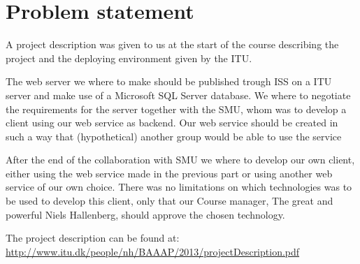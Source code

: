 \section{Problem statement}
A project description was given to us at the start of the course describing the project and the deploying environment given by the ITU.

The web server we where to make should be published trough ISS on a ITU server and make use of a Microsoft SQL Server database.
We where to negotiate the requirements for the server together with the SMU, whom was to develop a client using our web service as backend.
Our web service should be created in such a way that (hypothetical) another group would be able to use the service

After the end of the collaboration with SMU we where to develop our own client, either using the web service made in the previous part or using another web service of our own choice.
There was no limitations on which technologies was to be used to develop this client, only that our Course manager, The great and powerful Niels Hallenberg, should approve the chosen technology.

The project description can be found at: \url{http://www.itu.dk/people/nh/BAAAP/2013/projectDescription.pdf}
\newpage